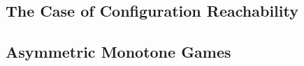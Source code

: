 \subsection{The Case of Configuration Reachability}
\label{12-sub-reach}


\subsection{Asymmetric Monotone Games}
\label{12-sub-mono}


